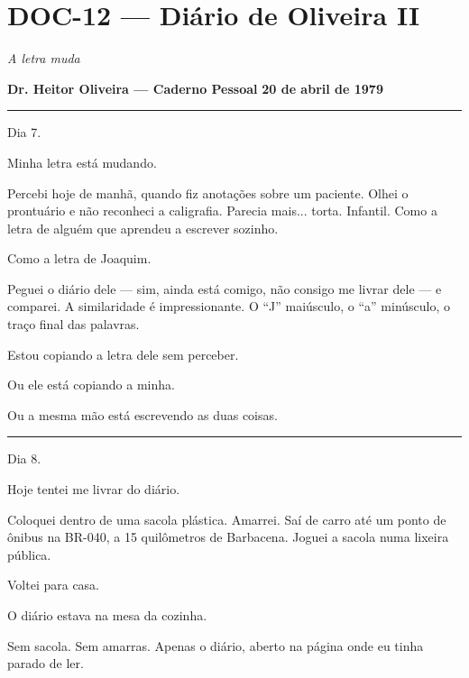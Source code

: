 \section*{\textbf{DOC-12} --- Diário de Oliveira II}

\noindent \textit{A letra muda}

\noindent \textbf{Dr. Heitor Oliveira --- Caderno Pessoal}
\textbf{20 de abril de 1979}

\vspace{0.5em}\noindent\rule{\textwidth}{0.5pt}\vspace{0.5em}

\noindent Dia 7.

\noindent Minha letra está mudando.

\noindent Percebi hoje de manhã, quando fiz anotações sobre um paciente. Olhei o prontuário e não reconheci a caligrafia. Parecia mais... torta. Infantil. Como a letra de alguém que aprendeu a escrever sozinho.

\noindent Como a letra de Joaquim.

\noindent Peguei o diário dele --- sim, ainda está comigo, não consigo me livrar dele --- e comparei. A similaridade é impressionante. O \textquotedblleft{}J\textquotedblright{} maiúsculo, o \textquotedblleft{}a\textquotedblright{} minúsculo, o traço final das palavras.

\noindent Estou copiando a letra dele sem perceber.

\noindent Ou ele está copiando a minha.

\noindent Ou a mesma mão está escrevendo as duas coisas.

\vspace{0.5em}\noindent\rule{\textwidth}{0.5pt}\vspace{0.5em}

\noindent Dia 8.

\noindent Hoje tentei me livrar do diário.

\noindent Coloquei dentro de uma sacola plástica. Amarrei. Saí de carro até um ponto de ônibus na BR-040, a 15 quilômetros de Barbacena. Joguei a sacola numa lixeira pública.

\noindent Voltei para casa.

\noindent O diário estava na mesa da cozinha.

\noindent Sem sacola. Sem amarras. Apenas o diário, aberto na página onde eu tinha parado de ler.


